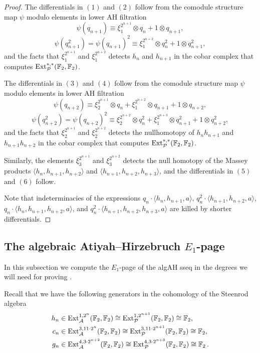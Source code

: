 \begin{proof}
The differentials in $(1)$ and $(2)$ follow from the comodule structure map $\psi$ modulo elements in lower AH filtration
$$\psi(q_{n+1}) \equiv \xi_1^{2^{n+1}} \otimes q_n + 1 \otimes q_{n+1},$$
$$\psi(q_{n+1}^2) = \psi(q_{n+1})^2 \equiv \xi_1^{2^{n+2}} \otimes q_n^2 + 1 \otimes q_{n+1}^2,$$
and the facts that $ \xi_1^{2^{n+1}}$ and $ \xi_1^{2^{n+2}}$ detects $h_n$ and $h_{n+1}$ in the cobar complex that computes $\operatorname{\mathrm{Ext}}_{\mathcal{P}}^{*,*}(\operatorname{\mathbb{F}}_2, \operatorname{\mathbb{F}}_2)$.

The differentials in $(3)$ and $(4)$ follow from the comodule structure map $\psi$ modulo elements in lower AH filtration
$$\psi(q_{n+2}) \equiv \xi_2^{2^{n+1}} \otimes q_{n} + \xi_1^{2^{n+2}} \otimes q_{n+1} + 1 \otimes q_{n+2},$$
$$\psi(q_{n+2}^2) = \psi(q_{n+2})^2 \equiv  \xi_2^{2^{n+2}} \otimes q_{n}^2 + \xi_1^{2^{n+3}} \otimes q_{n+1}^2 + 1 \otimes q_{n+2}^2,$$
and the facts that $\xi_2^{2^{n+1}}$ and $ \xi_2^{2^{n+2}}$ detects the nullhomotopy of $h_nh_{n+1}$ and $h_{n+1}h_{n+2}$ in the cobar complex that computes $\operatorname{\mathrm{Ext}}_{\mathcal{P}}^{*,*}(\operatorname{\mathbb{F}}_2, \operatorname{\mathbb{F}}_2)$.

Similarly, the elements $\xi_3^{2^{n+1}}$ and $ \xi_3^{2^{n+2}}$ detects the null homotopy of the Massey products $\langle h_n, h_{n+1}, h_{n+2} \rangle$ and  $\langle h_{n+1}, h_{n+2}, h_{n+3} \rangle$, and the differentials in $(5)$ and $(6)$ follow.

Note that indeterminacies of the expressions $q_{n} \cdot  \langle h_n, h_{n+1}, a \rangle$, $q_{n}^2 \cdot  \langle h_{n+1}, h_{n+2}, a \rangle$,\\  $q_{n} \cdot  \langle h_n, h_{n+1}, h_{n+2}, a \rangle$, and $q_{n}^2 \cdot  \langle h_{n+1}, h_{n+2}, h_{n+3}, a \rangle$ are killed by shorter differentials.
\end{proof}

\subsection{The algebraic Atiyah--Hirzebruch $E_1$-page}
\label{subsec q03gn algAHSS}\hfill

In this subsection we compute the $E_1$-page of the algAH sseq in the degrees we will need for proving .

\begin{rec}
  Recall that we have the following generators in the cohomology of the Steenrod algebra
  \begin{align*}
    h_n & \in \operatorname{\mathrm{Ext}}_{\operatorname{\mathcal{A}}}^{1, 2^n}(\operatorname{\mathbb{F}}_2, \operatorname{\mathbb{F}}_2) \cong \operatorname{\mathrm{Ext}}_{\mathcal{P}}^{1,2^{n+1}}(\operatorname{\mathbb{F}}_2, \operatorname{\mathbb{F}}_2) \cong \operatorname{\mathbb{F}}_2, \\ 
    c_n & \in \operatorname{\mathrm{Ext}}_{\operatorname{\mathcal{A}}}^{3, 11\cdot 2^n}(\operatorname{\mathbb{F}}_2, \operatorname{\mathbb{F}}_2) \cong \operatorname{\mathrm{Ext}}_{\mathcal{P}}^{3, 11 \cdot 2^{n+1}}(\operatorname{\mathbb{F}}_2, \operatorname{\mathbb{F}}_2) \cong \operatorname{\mathbb{F}}_2, \\
    g_n & \in \operatorname{\mathrm{Ext}}_{\operatorname{\mathcal{A}}}^{4, 3\cdot 2^{n+2}}(\operatorname{\mathbb{F}}_2, \operatorname{\mathbb{F}}_2) \cong \operatorname{\mathrm{Ext}}_{\mathcal{P}}^{4, 3 \cdot 2^{n+3}}(\operatorname{\mathbb{F}}_2, \operatorname{\mathbb{F}}_2) \cong \operatorname{\mathbb{F}}_2.
  \end{align*}
\end{rec}
  
